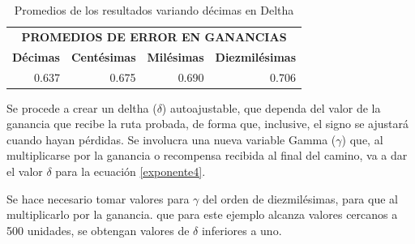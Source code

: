 \begin{table}[H]
\centering
\caption{Promedios de los resultados variando décimas en Deltha}
\begin{tabular}{llll}
\multicolumn{4}{c}{\textbf{PROMEDIOS DE ERROR EN GANANCIAS}}                                                  \\
\textbf{Décimas}          & \textbf{Centésimas}       & \textbf{Milésimas}        & \textbf{Diezmilésimas}    \\
\multicolumn{1}{r}{0.637} & \multicolumn{1}{r}{0.675} & \multicolumn{1}{r}{0.690} & \multicolumn{1}{r}{0.706}
\end{tabular}
\label{delthas_0000}
\end{table}

Se procede a crear un deltha ($\delta$) autoajustable, que dependa del valor de la ganancia que recibe la ruta probada, de forma que, inclusive, el signo se ajustará cuando hayan pérdidas. Se involucra una nueva variable Gamma ($\gamma$) que, al multiplicarse por la ganancia o recompensa recibida al final del camino, va a dar el valor $\delta$ para la ecuación \ref{exponente4}.

Se hace necesario tomar valores para $\gamma$ del orden de diezmilésimas, para que al multiplicarlo por la ganancia. que para este ejemplo alcanza valores cercanos a 500 unidades, se obtengan valores de $\delta$ inferiores a uno.

